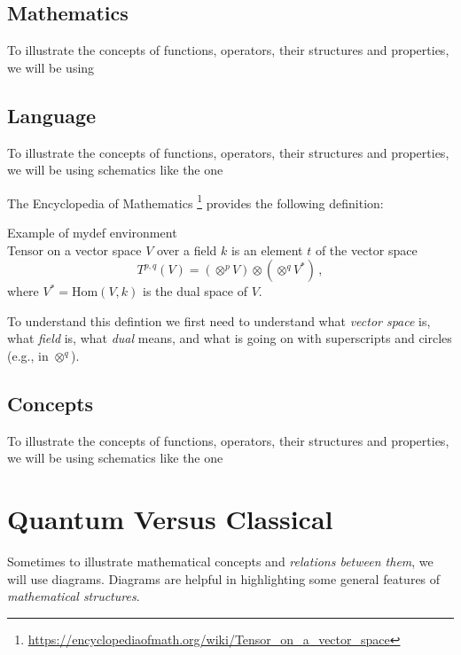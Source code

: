 \subsection{Mathematics}
To illustrate the concepts of functions, operators, their structures and
properties, we will be using 

\subsection{Language}
To illustrate the concepts of functions, operators, their structures and
properties, we will be using schematics like the one

The Encyclopedia of Mathematics
\footnote{\url{https://encyclopediaofmath.org/wiki/Tensor_on_a_vector_space}}
provides the following definition:

\begin{mydef}{Example of mydef environment}\\
  \small
Tensor on a vector space $V$ over a field $k$ is an element $t$ of the
vector space
\begin{equation*}
	T^{p,q} (V) = (\otimes^p V)\otimes (\otimes^q V^*)\,,
\end{equation*}
where $V^*=\textrm{Hom}(V, k)$ is the dual space of $V$.
\label{tcb:tensorDefinition1}
\end{mydef}
To understand this defintion we first need to understand what
\emph{vector space} is, what \emph{field} is, what \emph{dual} means,
and what is going on with superscripts and circles (e.g., in
$\otimes^q$).

\subsection{Concepts}
To illustrate the concepts of functions, operators, their structures and
properties, we will be using schematics like the one


\section{Quantum Versus Classical}
Sometimes to illustrate mathematical concepts and \emph{relations between them},
we will use diagrams. Diagrams are helpful in highlighting
some general features of \emph{mathematical structures}.

